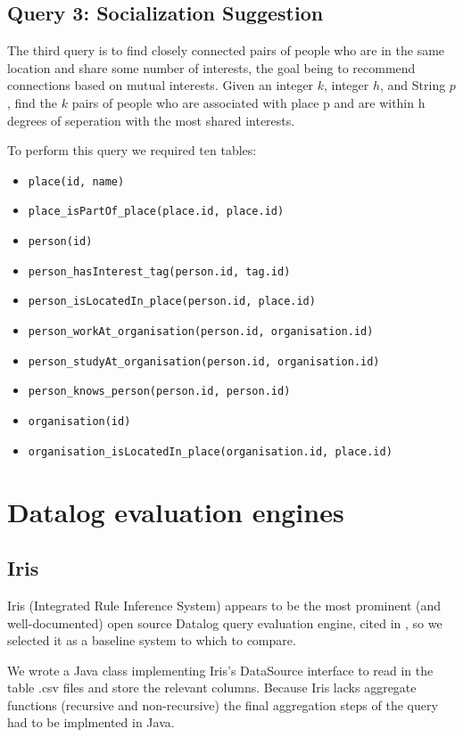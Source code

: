 \documentclass{article}
\begin{document}
\begin{multicols}{2}
\subsection{Query 3: Socialization Suggestion}
The third query is to find closely connected pairs of people who are in the same location and share some number of interests, the goal being to recommend connections based on mutual interests. Given an integer $k$, integer $h$, and String $p$, find the $k$ pairs of people who are associated with place p and are within h degrees of seperation with the most shared interests.

To perform this query we required ten tables: 
\begin{itemize}
\item \texttt{place(id, name)}
\item \texttt{place\_isPartOf\_place(place.id, place.id)}
\item \texttt{person(id)}
\item \texttt{person\_hasInterest\_tag(person.id, tag.id)}
\item \texttt{person\_isLocatedIn\_place(person.id, place.id)}
\item \texttt{person\_workAt\_organisation(person.id, organisation.id)}
\item \texttt{person\_studyAt\_organisation(person.id, organisation.id)}
\item \texttt{person\_knows\_person(person.id, person.id)}
\item \texttt{organisation(id)}
\item \texttt{organisation\_isLocatedIn\_place(organisation.id, place.id)}
\end{itemize}

\section{Datalog evaluation engines}

\subsection{Iris}

Iris (Integrated Rule Inference System) appears to be the most prominent (and well-documented) open source Datalog query evaluation engine, cited in \cite{seo-et-al-13a}, so we selected it as a baseline system to which to compare.

We wrote a Java class implementing Iris's DataSource interface to read in the table .csv files and store the relevant columns. Because Iris lacks aggregate functions (recursive and non-recursive) the final aggregation steps of the query had to be implmented in Java. 


\end{multicols}
\end{document}
